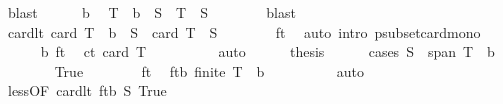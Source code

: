\begin{isabellebody}
\ blast\isanewline
\ \ \ \ \isamarkupfalse%
\ b\ \isamarkupfalse%
\ {\isachardoublequoteopen}T\ {\isacharminus}{\kern0pt}\ {\isacharbraceleft}{\kern0pt}b{\isacharbraceright}{\kern0pt}\ {\isacharminus}{\kern0pt}\ S\ {\isasymsubset}\ T\ {\isacharminus}{\kern0pt}\ S{\isachardoublequoteclose}\isanewline
\ \ \ \ \ \ \isamarkupfalse%
\ blast\isanewline
\ \ \ \ \isamarkupfalse%
\ \isamarkupfalse%
\ cardlt{\isacharcolon}{\kern0pt}\ {\isachardoublequoteopen}card\ {\isacharparenleft}{\kern0pt}T\ {\isacharminus}{\kern0pt}\ {\isacharbraceleft}{\kern0pt}b{\isacharbraceright}{\kern0pt}\ {\isacharminus}{\kern0pt}\ S{\isacharparenright}{\kern0pt}\ {\isacharless}{\kern0pt}\ card\ {\isacharparenleft}{\kern0pt}T\ {\isacharminus}{\kern0pt}\ S{\isacharparenright}{\kern0pt}{\isachardoublequoteclose}\isanewline
\ \ \ \ \ \ \isamarkupfalse%
\ ft\ \isamarkupfalse%
\ {\isacharparenleft}{\kern0pt}auto\ intro{\isacharcolon}{\kern0pt}\ psubset{\isacharunderscore}{\kern0pt}card{\isacharunderscore}{\kern0pt}mono{\isacharparenright}{\kern0pt}\isanewline
\ \ \ \ \isamarkupfalse%
\ b\ ft\ \isamarkupfalse%
\ ct{}{\isacharcolon}{\kern0pt}\ {\isachardoublequoteopen}card\ T\ {\isasymnoteq}\ {}{\isachardoublequoteclose}\isanewline
\ \ \ \ \ \ \isamarkupfalse%
\ auto\isanewline
\ \ \ \ \isamarkupfalse%
\ {\isacharquery}{\kern0pt}thesis\isanewline
\ \ \ \ \isamarkupfalse%
\ {\isacharparenleft}{\kern0pt}cases\ {\isachardoublequoteopen}S\ {\isasymsubseteq}\ span\ {\isacharparenleft}{\kern0pt}T\ {\isacharminus}{\kern0pt}\ {\isacharbraceleft}{\kern0pt}b{\isacharbraceright}{\kern0pt}{\isacharparenright}{\kern0pt}{\isachardoublequoteclose}{\isacharparenright}{\kern0pt}\isanewline
\ \ \ \ \ \ \isamarkupfalse%
\ True\isanewline
\ \ \ \ \ \ \isamarkupfalse%
\ ft\ \isamarkupfalse%
\ ftb{\isacharcolon}{\kern0pt}\ {\isachardoublequoteopen}finite\ {\isacharparenleft}{\kern0pt}T\ {\isacharminus}{\kern0pt}\ {\isacharbraceleft}{\kern0pt}b{\isacharbraceright}{\kern0pt}{\isacharparenright}{\kern0pt}{\isachardoublequoteclose}\isanewline
\ \ \ \ \ \ \ \ \isamarkupfalse%
\ auto\isanewline
\ \ \ \ \ \ \isamarkupfalse%
\ less{\isacharparenleft}{\kern0pt}{}{\isacharparenright}{\kern0pt}{\isacharbrackleft}{\kern0pt}OF\ cardlt\ ftb\ S\ True{\isacharbrackright}{\kern0pt}\isanewline
\ \ \ \ \ \ \isamarkupfalse%

\end{isabellebody}

